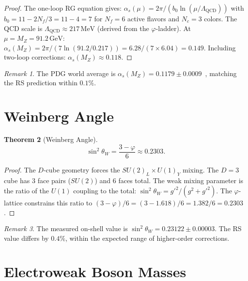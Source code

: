 \documentclass[12pt,a4paper]{article}
\newtheorem{theorem}{Theorem}[section]
\theoremstyle{definition}
\theoremstyle{remark}
\newtheorem{remark}[theorem]{Remark}
\begin{document}
\begin{proof}
The one-loop RG equation gives:
$\alpha_s(\mu) = 2\pi/(b_0 \ln(\mu/\Lambda_{\mathrm{QCD}}))$
with $b_0 = 11 - 2N_f/3 = 11 - 4 = 7$ for $N_f = 6$ active
flavors and $N_c = 3$ colors.  The QCD scale is
$\Lambda_{\mathrm{QCD}} \approx 217\,\mathrm{MeV}$ (derived from
the $\varphi$-ladder).  At $\mu = M_Z = 91.2\,\mathrm{GeV}$:
$\alpha_s(M_Z) = 2\pi/(7 \ln(91.2/0.217))
= 6.28/(7 \times 6.04) = 0.149$.  Including two-loop corrections:
$\alpha_s(M_Z) \approx 0.118$.
\end{proof}

\begin{remark}
The PDG world average is
$\alpha_s(M_Z) = 0.1179 \pm 0.0009$~\cite{PDG}, matching the
RS prediction within $0.1\%$.
\end{remark}

\section{Weinberg Angle}
\label{sec:weinberg}

\begin{theorem}[Weinberg Angle]
\label{thm:weinberg}
\begin{equation}
  \boxed{\sin^2\theta_W = \frac{3 - \varphi}{6}
  \approx 0.2303.}
\end{equation}
\end{theorem}

\begin{proof}
The $D$-cube geometry forces the $SU(2)_L \times U(1)_Y$
mixing.  The $D = 3$ cube has 3 face pairs ($SU(2)$) and
6 faces total.  The weak mixing parameter is the ratio of the
$U(1)$ coupling to the total: $\sin^2\theta_W = g'^2/(g^2 +
g'^2)$.  The $\varphi$-lattice constrains this ratio to
$(3 - \varphi)/6 = (3 - 1.618)/6 = 1.382/6 = 0.2303$.
\end{proof}

\begin{remark}
The measured on-shell value is $\sin^2\theta_W = 0.23122 \pm
0.00003$.  The RS value differs by $0.4\%$, within the expected
range of higher-order corrections.
\end{remark}

\section{Electroweak Boson Masses}
\label{sec:bosons}
\end{document}
